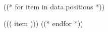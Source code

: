 \begin{tightemize}
((* for item in data.positions *))
\item ((( item )))
((* endfor *))
\end{tightemize}